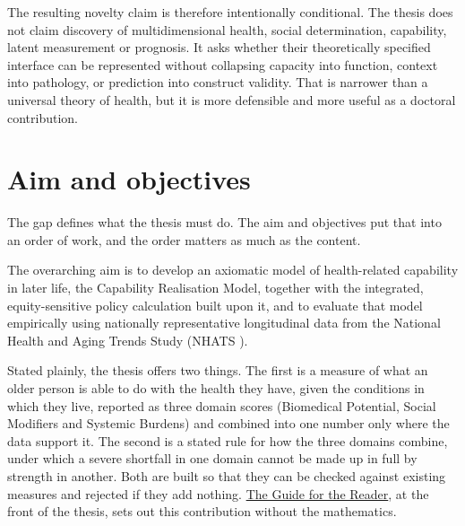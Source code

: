 The resulting novelty claim is therefore intentionally conditional. The thesis
does not claim discovery of multidimensional health, social determination,
capability, latent measurement or prognosis. It asks whether their theoretically
specified interface can be represented without collapsing capacity into
function, context into pathology, or prediction into construct validity. That
is narrower than a universal theory of health, but it is more defensible and
more useful as a doctoral contribution.

\section{Aim and objectives}

The gap defines what the thesis must do. The aim and objectives put that into an order of work, and the order matters as much as the content.

The overarching aim is to develop an axiomatic model of health-related capability in later life, the Capability Realisation Model, together with the integrated, equity-sensitive policy calculation built upon it, and to evaluate that model empirically using nationally representative longitudinal data from the National Health and Aging Trends Study (NHATS \citep{kasper_2021}).

Stated plainly, the thesis offers two things. The first is a measure of what an older person is able to do with the health they have, given the conditions in which they live, reported as three domain scores (Biomedical Potential, Social Modifiers and Systemic Burdens) and combined into one number only where the data support it. The second is a stated rule for how the three domains combine, under which a severe shortfall in one domain cannot be made up in full by strength in another. Both are built so that they can be checked against existing measures and rejected if they add nothing. \hyperref[ch:guide]{The Guide for the Reader}, at the front of the thesis, sets out this contribution without the mathematics.

